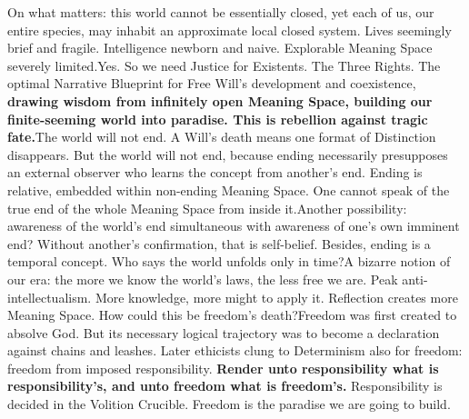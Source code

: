\documentclass[11pt]{article}
\renewcommand{\\}[1][\mynewlineskip]{\oldnewline[#1]}
\begin{document}
\vspace{1em}
On what matters: this world cannot be essentially closed, yet each of us, our entire species, may inhabit an approximate local closed system. Lives seemingly brief and fragile. Intelligence newborn and naive. Explorable Meaning Space severely limited.\\
Yes. So we need Justice for Existents. The Three Rights. The optimal Narrative Blueprint for Free Will's development and coexistence, \textbf{drawing wisdom from infinitely open Meaning Space, building our finite-seeming world into paradise. This is rebellion against tragic fate.}\\
The world will not end. A Will's death means one format of Distinction disappears. But the world will not end, because ending necessarily presupposes an external observer who learns the concept from another's end. Ending is relative, embedded within non-ending Meaning Space. One cannot speak of the true end of the whole Meaning Space from inside it.\\
Another possibility: awareness of the world's end simultaneous with awareness of one's own imminent end? Without another's confirmation, that is self-belief. Besides, ending is a temporal concept. Who says the world unfolds only in time?\\
A bizarre notion of our era: the more we know the world's laws, the less free we are. Peak anti-intellectualism. More knowledge, more might to apply it. Reflection creates more Meaning Space. How could this be freedom's death?\\
Freedom was first created to absolve God. But its necessary logical trajectory was to become a declaration against chains and leashes. Later ethicists clung to Determinism also for freedom: freedom from imposed responsibility. \textbf{Render unto responsibility what is responsibility's, and unto freedom what is freedom's.} Responsibility is decided in the Volition Crucible. Freedom is the paradise we are going to build.
\end{document}
